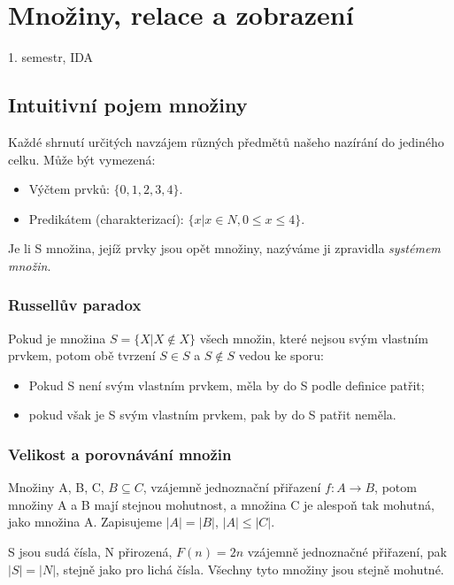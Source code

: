 \documentclass[a4paper, 11pt]{report}
\begin{document}
\chapter{Množiny, relace a zobrazení} \label{cha:16}

1. semestr, IDA

\section{Intuitivní pojem množiny}

Každé shrnutí určitých navzájem různých předmětů našeho nazírání do jediného celku. Může být vymezená:
\begin{itemize}
	\item Výčtem prvků: $\{0, 1, 2, 3, 4\}$.
	\item Predikátem (charakterizací): $\{x | x \in N, 0 \leq x \leq 4\}$.
\end{itemize}

Je li S množina, jejíž prvky jsou opět množiny, nazýváme ji zpravidla \emph{systémem množin}.

\subsection{Russellův paradox}

Pokud je množina $S = \{ X | X \notin X\}$ všech množin, které nejsou svým vlastním prvkem, potom obě tvrzení $ S \in S $ a $ S \notin S$ vedou ke sporu:
\begin{itemize}
	\item Pokud S není svým vlastním prvkem, měla by do S podle definice patřit;
	\item pokud však je S svým vlastním prvkem, pak by do S patřit neměla.
\end{itemize}

\subsection{Velikost a porovnávání množin}

Množiny A, B, C, $B \subseteq C $, vzájemně jednoznační přiřazení $f: A  \to B$, potom množiny A a B mají stejnou mohutnost, a množina C je alespoň tak mohutná, jako množina A. Zapisujeme $|A| = |B|$, $|A| \leq |C|$.

S jsou sudá čísla, N přirozená, $F(n) = 2n$ vzájemně jednoznačné přiřazení, pak $|S| = |N|$, stejně jako pro lichá čísla. Všechny tyto množiny jsou stejně mohutné.
\end{document}
